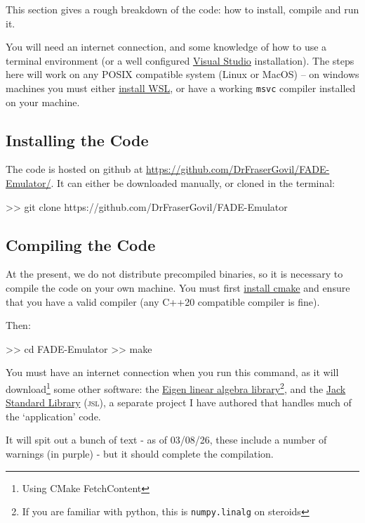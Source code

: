 
This section gives a rough breakdown of the \fade{} code: how to install, compile and run it.

You will need an internet connection, and some knowledge of how to use a terminal environment (or a well configured \href{https://visualstudio.microsoft.com/}{Visual Studio} installation). The steps here will work on any POSIX compatible system (Linux or MacOS) -- on windows machines you must either \href{https://learn.microsoft.com/en-us/windows/wsl/install}{install WSL}, or have a working \texttt{msvc} compiler installed on your machine.

\subsection{Installing the Code}

	The code is hosted on github at \url{https://github.com/DrFraserGovil/FADE-Emulator/}. It can either be downloaded manually, or cloned in the terminal:

	\begin{terminal}
>> git clone https://github.com/DrFraserGovil/FADE-Emulator
	\end{terminal}

	\def\jsl{\textmd{\textsc{jsl}}}

\subsection{Compiling the Code}
	At the present, we do not distribute precompiled binaries, so it is necessary to compile the code on your own machine. You must first \href{https://cmake.org/download/}{install cmake} and ensure that you have a valid compiler (any C++20 compatible compiler is fine).

	Then:
	\begin{terminal}
>> cd FADE-Emulator
>> make
	\end{terminal}

	You must have an internet connection when you run this command, as it will download\footnote{Using CMake FetchContent} some other software: the \href{https://libeigen.gitlab.io/}{Eigen linear algebra library}\footnote{If you are familiar with python, this is \texttt{numpy.linalg} on steroids}, and the \href{https://github.com/DrFraserGovil/JSL}{Jack Standard Library} (\jsl{}), a separate project I have authored that handles much of the `application' code.

	It will spit out a bunch of text  - as of 03/08/26, these include a number of warnings (in purple) - but it should complete the compilation.

